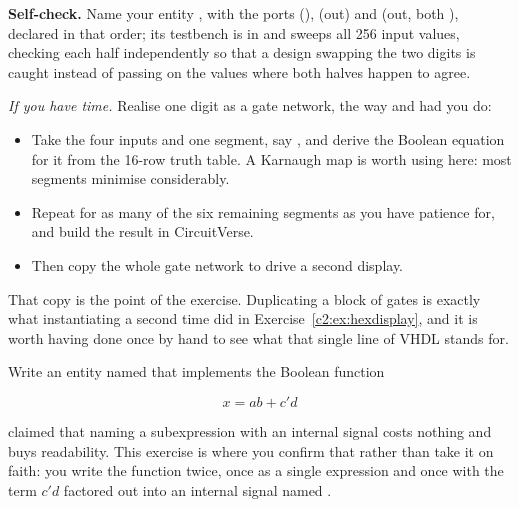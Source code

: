 
\begin{selfcheck}
\textbf{Self-check.} Name your entity , with the ports 
(),  (out) and  (out, both
), declared in that order; its testbench is in
 and sweeps all 256 input values, checking each half independently so
that a design swapping the two digits is caught instead of passing on the values where both halves
happen to agree.
\end{selfcheck}

\label{c2:ex:segments}
\emph{If you have time.} Realise one digit as a gate network, the way  and
 had you do:
\begin{itemize}
  \item Take the four inputs and one segment, say , and derive the Boolean equation for it
    from the 16-row truth table. A Karnaugh map is worth using here: most segments minimise
    considerably.
  \item Repeat for as many of the six remaining segments as you have patience for, and build the
    result in CircuitVerse.
  \item Then copy the whole gate network to drive a second display.
\end{itemize}

That copy is the point of the exercise. Duplicating a block of gates is exactly what instantiating
 a second time did in Exercise~\ref{c2:ex:hexdisplay}, and it is worth having done
once by hand to see what that single line of VHDL stands for.


\label{c2:ex:combo}
Write an entity named  that implements the Boolean function

\[ x = ab + c'd \]

 claimed that naming a subexpression with an internal signal costs nothing and
buys readability. This exercise is where you confirm that rather than take it on faith: you write
the function twice, once as a single expression and once with the term $c'd$ factored out into an
internal signal named .

